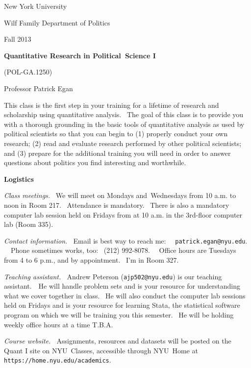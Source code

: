 \documentclass[11pt]{article}
\begin{document}
New York University

Wilf Family Department of Politics

Fall 2013

\bigskip

\begin{center}
{\large \textbf{Quantitative Research in Political\ Science I}}

(POL-GA.1250)

Professor Patrick Egan
\end{center}

This class is the first step in your training for a lifetime of research and
scholarship using quantitative analysis. \ The goal of this class is to
provide you with a thorough grounding in the basic tools of quantitative
analysis as used by political scientists so that you can begin to (1)
properly conduct your own research; (2) read and evaluate research performed
by other political scientists; and (3) prepare for the additional training
you will need in order to answer questions about politics you find
interesting and worthwhile.

\bigskip

\textbf{Logistics}

\bigskip

\textit{Class meetings.} \ We will meet on Mondays and\ Wednesdays from 10
a.m. to noon in Room 217. \ Attendance is mandatory. \ There is also a
mandatory computer lab session held on Fridays from at 10 a.m. in the
3rd-floor computer lab (Room 335).

\bigskip

\textit{Contact information. \ }Email is best way to reach me: \ \texttt{%
patrick.egan@nyu.edu}. \ \ Phone sometimes works, too: \ (212) 992-8078. \ \
Office hours are Tuesdays from 4 to 6 p.m., and by appointment. \ I'm in
Room 327.

\bigskip

\textit{Teaching assistant. \ }Andrew Peterson (\texttt{ajp502@nyu.edu}) is
our teaching assistant.\ \ He will handle problem sets and is your resource
for understanding what we cover together in class. \ He will also conduct
the computer lab sessions held on Fridays and is your resource for learning
Stata, the statistical software program on which we will be training you
this semester. \ He will be holding weekly office hours at a time T.B.A.

\bigskip 

\textit{Course website. \ }Assignments, resources and datasets will be
posted on the Quant I site on NYU\ Classes, accessible through NYU\ Home at 
\texttt{https://home.nyu.edu/academics}.
\end{document}
